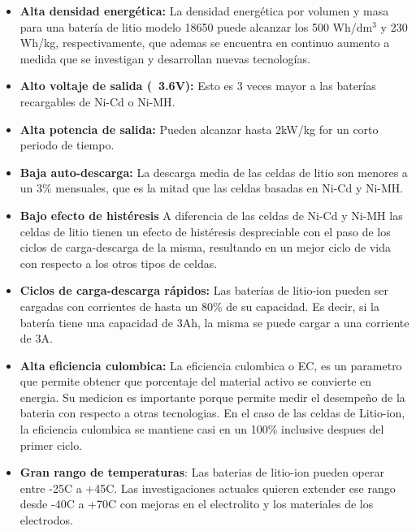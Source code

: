 \documentclass[10pt,a4paper]{article}
\begin{document}
\begin{itemize}
    \item \textbf{Alta densidad energética:} La densidad energética por
	volumen y masa para una batería de litio modelo 18650 puede alcanzar
	los 500 Wh/$\mathrm{dm^3}$ y 230 Wh/kg, respectivamente, que ademas
	se encuentra en continuo aumento a medida que se investigan y
	desarrollan nuevas tecnologías.
    \item \textbf{Alto voltaje de salida (~3.6V):} Esto es 3 veces mayor a
	las baterías recargables de Ni-Cd o Ni-MH.
    \item \textbf{Alta potencia de salida:} Pueden alcanzar hasta 2kW/kg for
	un corto periodo de tiempo.
    \item \textbf{Baja auto-descarga:} La descarga media de las celdas de
	litio son menores a un 3\% mensuales, que es la mitad que las celdas
	basadas en Ni-Cd y Ni-MH.
    \item \textbf{Bajo efecto de histéresis} A diferencia de las celdas de
	Ni-Cd y Ni-MH las celdas de litio tienen un efecto de histéresis
	despreciable con el paso de los ciclos de carga-descarga de la
	misma, resultando en un mejor ciclo de vida con respecto a los otros
	tipos de celdas.
    \item \textbf{Ciclos de carga-descarga rápidos:} Las baterías de
	litio-ion pueden ser cargadas con corrientes de hasta un 80\% de su
	capacidad. Es decir, si la batería tiene una capacidad de 3Ah, la
	misma se puede cargar a una corriente de 3A.
    \item \textbf{Alta eficiencia culombica:} La eficiencia culombica o EC,
	es un parametro que permite obtener que porcentaje del material
	activo se convierte en energia. Su medicion es importante porque 
	permite medir el desempeño de la bateria con respecto a otras 
	tecnologias. En el caso de las celdas de Litio-ion, la eficiencia 
	culombica se mantiene casi en un 100\% inclusive despues del primer
	ciclo.
    \item \textbf{Gran rango de temperaturas}: Las baterias de litio-ion
	pueden operar entre -25\degree C a +45\degree C. Las
	investigaciones actuales quieren extender ese rango desde
	-40\degree C a +70\degree C con mejoras en el
	electrolito y los materiales de los electrodos.


\end{itemize}
\end{document}
